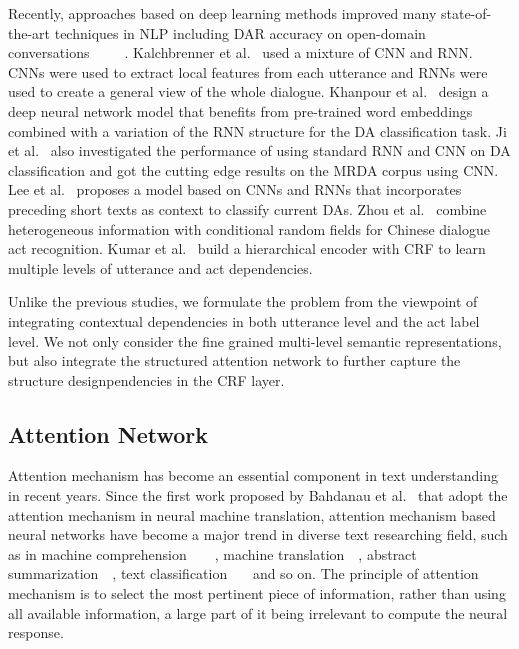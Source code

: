 \documentclass[sigconf]{acmart}
\begin{document}
Recently, approaches based on deep learning methods improved many state-of-the-art techniques in NLP including DAR accuracy on open-domain conversations~\cite{Kalchbrenner2013Recurrent}~\cite{zhou2015combining}~\cite{Ji2016ALV}~\cite{Kumar2017DialogueAS}~\cite{lee2016sequential}. Kalchbrenner et al.~\cite{Kalchbrenner2013Recurrent} used a mixture of CNN and RNN. CNNs were used to extract local features from each utterance and RNNs were used to create a general view of the whole dialogue. Khanpour et al.~\cite{Khanpour2016Dialogue} design a deep neural network model that benefits from pre-trained word embeddings combined with a variation of the RNN structure for the DA classification task. Ji et al.~\cite{Ji2016ALV} also investigated the performance of using standard RNN and CNN on DA classification and got the cutting edge results on the MRDA corpus using CNN. Lee et al.~\cite{lee2016sequential} proposes a model based on CNNs and RNNs that incorporates preceding short texts as context to classify current DAs. Zhou et al.~\cite{zhou2015combining} combine heterogeneous information with conditional random fields for Chinese dialogue act recognition. Kumar et al.~\cite{Kumar2017DialogueAS} build a hierarchical encoder with CRF to learn multiple levels of utterance and act dependencies. 

Unlike the previous studies, we formulate the problem from the viewpoint of integrating contextual dependencies in both utterance level and the act label level. We not only consider the fine grained multi-level semantic representations, but also integrate the structured attention network to further capture the structure designpendencies in the CRF layer.
\subsection{Attention Network}
Attention mechanism has become an essential component in text understanding in recent years. Since the first work proposed by Bahdanau et al.~\cite{Bahdanau2014Neural} that  adopt the attention mechanism in neural machine translation, attention mechanism based neural networks have become a major trend in diverse text researching field, such as in machine comprehension~\cite{hermann2015teaching}~\cite{yinattention}~\cite{kadlectext}~\cite{dhingragated}, machine translation~\cite{luongeffective}~\cite{firat2016multi}, abstract summarization~\cite{rushneural}~\cite{allamanis2016convolutional}, text classification~\cite{wang2016relation}~\cite{zhou2016attention}~\cite{yang2016hierarchical} and so on. The principle of attention mechanism is to select the most pertinent piece of information, rather than using all available information, a large part of it being irrelevant to compute the neural response.
\end{document}
